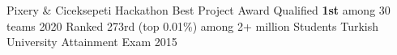 \begin{cvhonors}
  \cvhonor
    {Pixery \& Ciceksepeti Hackathon Best Project Award}
    {Qualified \textbf{1st} among 30 teams}
    {}
    {2020}
  \cvhonor
    {Ranked 273rd (top 0.01\%) among 2+ million Students}
    {Turkish University Attainment Exam}
    {}
    {2015}
\end{cvhonors}
